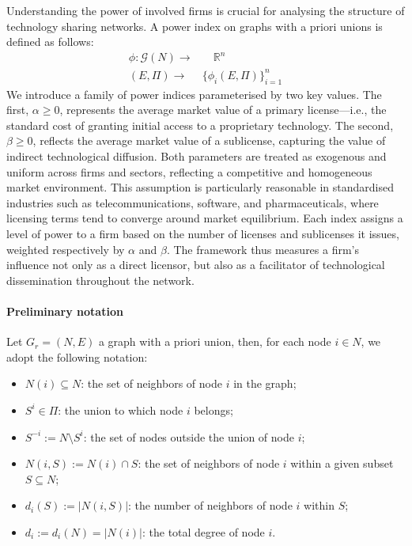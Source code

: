 \documentclass[preprint,11pt,authoryear]{elsarticle}
\theoremstyle{plain}
\begin{document}
Understanding  the power of involved firms is crucial for analysing the structure of technology sharing networks. 
A power index on graphs with a priori unions is defined as follows:  
\begin{align*}
\phi: \mathcal{G}(N) \to & \quad \mathbb{R}^n\\ 
(E,\Pi) \to &  \{\phi_i(E,\Pi)\}_{i=1}^{n}
\end{align*} 
We introduce a family of power indices parameterised by two key values. The first, $\alpha \geq 0$, represents the average market value of a primary license—i.e., the standard cost of granting initial access to a proprietary technology. The second, $\beta \geq 0$, reflects the average market value of a sublicense, capturing the value of indirect technological diffusion. Both parameters are treated as exogenous and uniform across firms and sectors, reflecting a competitive and homogeneous market environment. This assumption is particularly reasonable in standardised industries such as telecommunications, software, and pharmaceuticals, where licensing terms tend to converge around market equilibrium. Each index assigns a level of power to a firm based on the number of licenses and sublicenses it issues, weighted respectively by $\alpha$ and $\beta$. The framework thus measures a firm’s influence not only as a direct licensor, but also as a facilitator of technological dissemination throughout the network.\\

\paragraph{Preliminary notation}
Let \( G_r = (N, E) \) a graph with a priori union, then, for each node \( i \in N \), we adopt the following notation:

\begin{itemize}
    \item[-]\( N(i) \subseteq N \): the set of neighbors of node \( i \) in the graph;
    \item[-]\( S^i\in\Pi \): the union to which node \( i \) belongs;
    \item[-]\( S^{-i} := N \setminus S^i \): the set of nodes outside the union of node \( i \);
    \item[-]\( N(i, S) := N(i) \cap S \): the set of neighbors of node \( i \) within a given subset \( S \subseteq N \);
    \item[-]\( d_i(S) := |N(i, S)| \): the number of neighbors of node \( i \) within \( S \);
    \item[-]\( d_i := d_i(N) = |N(i)| \): the total degree of node \( i \).
    
\end{itemize}
\end{document}
